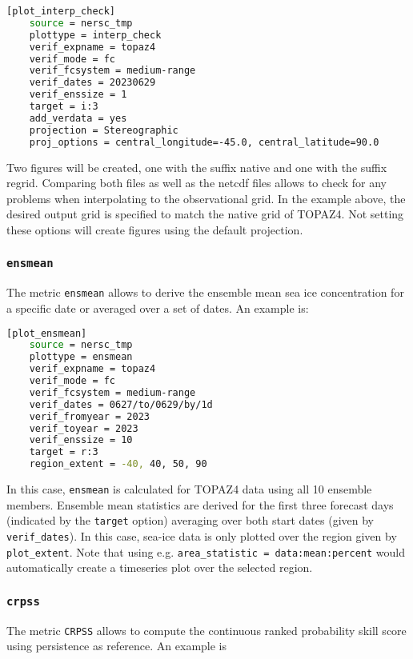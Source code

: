 \documentclass[DIV=10, parskip=full]{scrreprt}
\begin{document}
\begin{lstlisting}[language=bash]
	[plot_interp_check]
	source = nersc_tmp
	plottype = interp_check
	verif_expname = topaz4
	verif_mode = fc
	verif_fcsystem = medium-range
	verif_dates = 20230629
	verif_enssize = 1
	target = i:3
	add_verdata = yes
	projection = Stereographic
	proj_options = central_longitude=-45.0, central_latitude=90.0
\end{lstlisting}

Two figures will be created, one with the suffix native and one with the suffix regrid. Comparing both files as well as the netcdf files allows to check for any problems when interpolating to the observational grid. In the example above, the desired output grid is specified to match the native grid of TOPAZ4. Not setting these options will create figures using the default projection.   

\subsubsection{\texttt{ensmean}}
The metric \texttt{ensmean} allows to derive the ensemble mean sea ice concentration for a specific date or averaged over a set of dates. An example is:

\begin{lstlisting}[language=bash]
	[plot_ensmean]
	source = nersc_tmp
	plottype = ensmean
	verif_expname = topaz4
	verif_mode = fc
	verif_fcsystem = medium-range
	verif_dates = 0627/to/0629/by/1d
	verif_fromyear = 2023
	verif_toyear = 2023
	verif_enssize = 10
	target = r:3
	region_extent = -40, 40, 50, 90
\end{lstlisting}

In this case, \texttt{ensmean} is calculated for TOPAZ4 data using all 10 ensemble members. Ensemble mean statistics are derived for the first three forecast days (indicated by the \texttt{target} option) averaging over both start dates (given by \texttt{verif\_dates}). In this case, sea-ice data is only plotted over the region given by \texttt{plot\_extent}. Note that using e.g. \texttt{area\_statistic = data:mean:percent} would automatically create a timeseries plot over the selected region.

\subsubsection{\texttt{crpss}}
The metric \texttt{CRPSS} allows to compute the continuous ranked probability skill score using persistence as reference. An example is
\end{document}
